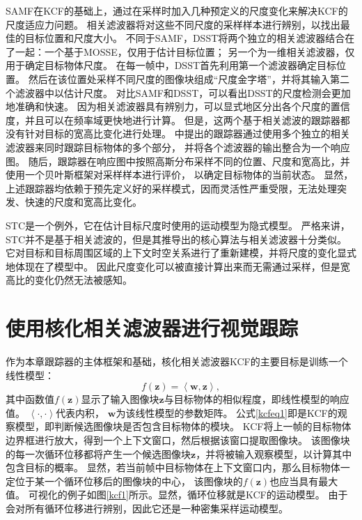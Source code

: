 SAMF在KCF的基础上，通过在采样时加入几种预定义的尺度变化来解决KCF的尺度适应力问题。
相关滤波器将对这些不同尺度的采样样本进行辨别，以找出最佳的目标位置和尺度大小。
不同于SAMF，DSST将两个独立的相关滤波器结合在了一起：一个基于MOSSE，仅用于估计目标位置；
另一个为一维相关滤波器，仅用于确定目标物体尺度。
在每一帧中，DSST首先利用第一个滤波器确定目标位置。
然后在该位置处采样不同尺度的图像块组成``尺度金字塔''，并将其输入第二个滤波器中以估计尺度。
对比SAMF和DSST，可以看出DSST的尺度检测会更加地准确和快速。
因为相关滤波器具有辨别力，可以显式地区分出各个尺度的置信度，并且可以在频率域更快地进行计算。
但是，这两个基于相关滤波的跟踪器都没有针对目标的宽高比变化进行处理。
\cite{pbcf}中提出的跟踪器通过使用多个独立的相关滤波器来同时跟踪目标物体的多个部分，
并将各个滤波器的输出整合为一个响应图。
随后，跟踪器在响应图中按照高斯分布采样不同的位置、尺度和宽高比，并使用一个贝叶斯框架对采样样本进行评价，
以确定目标物体的当前状态。
显然，上述跟踪器均依赖于预先定义好的采样模式，因而灵活性严重受限，无法处理突发、快速的尺度和宽高比变化。

STC是一个例外，它在估计目标尺度时使用的运动模型为隐式模型。
严格来讲，STC并不是基于相关滤波的，但是其推导出的核心算法与相关滤波器十分类似。
它对目标和目标周围区域的上下文时空关系进行了重新建模，并将尺度的变化显式地体现在了模型中。
因此尺度变化可以被直接计算出来而无需通过采样，但是宽高比的变化仍然无法被感知。

\section{使用核化相关滤波器进行视觉跟踪}
\label{kcfsec}
作为本章跟踪器的主体框架和基础，核化相关滤波器KCF的主要目标是训练一个线性模型：
\begin{equation}
f(\mathbf{z})=\left\langle\mathbf{w}, \mathbf{z}\right\rangle ,
\label{kcfeq1}
\end{equation}
其中函数值$f(\mathbf{z})$显示了输入图像块$\mathbf{z}$与目标物体的相似程度，即线性模型的响应值。
$\left\langle\cdot, \cdot\right\rangle$代表内积，
$\mathbf{w}$为该线性模型的参数矩阵。
公式\ref{kcfeq1}即是KCF的观察模型，即判断候选图像块是否包含目标物体的模块。
KCF将上一帧的目标物体边界框进行放大，得到一个上下文窗口，然后根据该窗口提取图像块。
该图像块的每一次循环位移都将产生一个候选图像块$\mathbf{z}$，并将被输入观察模型，以计算其中包含目标的概率。
显然，若当前帧中目标物体在上下文窗口内，那么目标物体一定位于某一个循环位移后的图像块的中心，
该图像块的$f(\mathbf{z})$也应当具有最大值。
可视化的例子如图\ref{kcf1}所示。显然，循环位移就是KCF的运动模型。
由于会对所有循环位移进行辨别，因此它还是一种密集采样运动模型。

